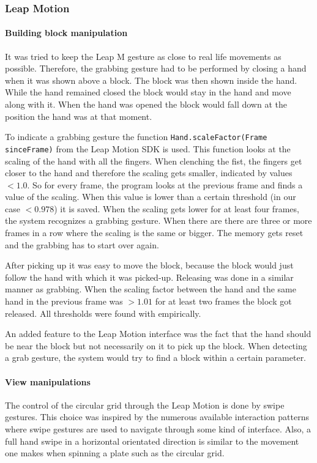 \subsubsection{Leap Motion}

\paragraph{Building block manipulation}
It was tried to keep the Leap M gesture as close to real life movements as possible. Therefore, the grabbing gesture had to be performed by closing a hand when it was 
shown above a block. The block was then shown inside the hand. While the hand remained closed the block would stay in the hand and move along with it. When the hand was opened 
the block would fall down at the position the hand was at that moment.

To indicate a grabbing gesture the function \texttt{Hand.scaleFactor(Frame sinceFrame)} from the Leap Motion SDK is used. This function looks at the scaling of the hand with 
all the fingers. When clenching the fist, the fingers get closer to the hand and therefore the scaling gets smaller, indicated by values $<1.0$. So for every frame, the program 
looks at the previous frame and finds a value of the scaling. When this value is lower than a certain threshold (in our case $<0.978$) it is saved. When the scaling gets lower 
for at least four frames, the system recognizes a grabbing gesture. When there are there are three or more frames in a row where the scaling is the same or bigger. The memory
 gets reset and the grabbing has to start over again.

After picking up it was easy to move the block, because the block would just follow the hand with which it was picked-up. Releasing was done in a similar manner as grabbing. 
When the scaling factor between the hand and the same hand in the previous frame was $>1.01$ for at least two frames the block got released. All thresholds were found with
 empirically.

An added feature to the Leap Motion interface was the fact that the hand should be near the block but not necessarily  on it to pick up the block. When detecting a grab gesture, 
the system would try to find a block within a certain parameter.

\paragraph{View manipulations}
The control of the circular grid through the Leap Motion is done by
swipe gestures. This choice was inspired by the numerous available
interaction patterns where swipe gestures are used to navigate through
some kind of interface. Also, a full hand swipe in a horizontal orientated
direction is similar to the movement one makes when spinning a plate
such as the circular grid. 

